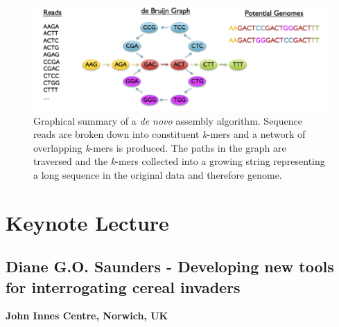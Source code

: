 \documentclass[12pt,]{book}
\theoremstyle{definition}
\theoremstyle{definition}
\theoremstyle{remark}
\begin{document}
\begin{figure}
\includegraphics[width=7.01in]{assets/algo} \caption{Graphical summary of a \emph{de novo} assembly algorithm.
Sequence reads are broken down into constituent \emph{k}-mers and a
network of overlapping \emph{k}-mers is produced. The paths in the graph
are traversed and the \emph{k}-mers collected into a growing string
representing a long sequence in the original data and therefore genome.}\label{fig:mainbio}
\end{figure}

\section*{Keynote Lecture}\label{keynote-lecture-1}

\subsection*{Diane G.O. Saunders - Developing new tools for
interrogating cereal
invaders}\label{diane-g.o.-saunders---developing-new-tools-for-interrogating-cereal-invaders}

\textbf{John Innes Centre, Norwich, UK}
\end{document}
